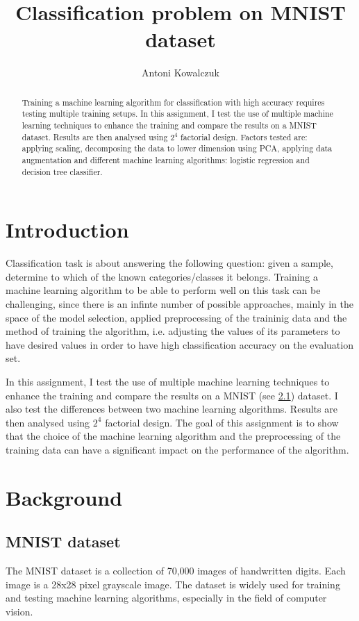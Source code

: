 \documentclass{article}
\title{Classification problem on MNIST dataset}
\author{%
  Antoni Kowalczuk \\
}
\begin{document}
\maketitle


\begin{abstract}
    Training a machine learning algorithm for classification with high accuracy requires testing multiple training setups. In this assignment, I test the use of multiple machine learning techniques to enhance the training and compare the results on a MNIST dataset. Results are then analysed using $2^4$ factorial design. Factors tested are: applying scaling, decomposing the data to lower dimension using PCA, applying data augmentation and different machine learning algorithms: logistic regression and decision tree classifier.
\end{abstract}


\section{Introduction}
Classification task is about answering the following question: given a sample, determine to which of the known categories/classes it belongs. Training a machine learning algorithm to be able to perform well on this task can be challenging, since there is an infinte number of possible approaches, mainly in the space of the model selection, applied preprocessing of the traininig data and the method of training the algorithm, i.e. adjusting the values of its parameters to have desired values in order to have high classification accuracy on the evaluation set.

In this assignment, I test the use of multiple machine learning techniques to enhance the training and compare the results on a MNIST (see \ref{subsec:mnist}) dataset. I also test the differences between two machine learning algorithms. Results are then analysed using $2^4$ factorial design. The goal of this assignment is to show that the choice of the machine learning algorithm and the preprocessing of the training data can have a significant impact on the performance of the algorithm.

\section{Background}

\subsection{MNIST dataset}
\label{subsec:mnist}
The MNIST dataset is a collection of 70,000 images of handwritten digits. Each image is a 28x28 pixel grayscale image. The dataset is widely used for training and testing machine learning algorithms, especially in the field of computer vision.
\end{document}
